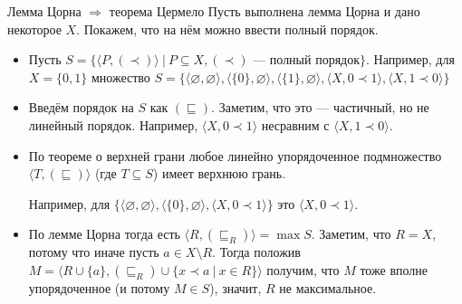 \documentclass[aspectratio=169]{beamer}
\begin{document}
\begin{frame}{Лемма Цорна $\Rightarrow$ теорема Цермело}
Пусть выполнена лемма Цорна и дано некоторое $X$. Покажем, что на нём можно ввести полный порядок.
\begin{itemize}
\item Пусть $S = \{ \langle P, (\prec)\rangle \ |\ P \subseteq X, (\prec)\text{ --- полный порядок} \}$.
{\color{gray}Например, для $X = \{0,1\}$ множество
$S = \{
\langle\varnothing,\varnothing\rangle,
\langle \{0\},\varnothing\rangle,
\langle\{1\},\varnothing\rangle,
\langle X, 0 \prec 1\rangle,
\langle X, 1 \prec 0\rangle
\}$}

\item Введём порядок на $S$ как $(\sqsubseteq)$. Заметим, что это --- частичный, но не линейный порядок. 
{\color{gray}Например, $\langle X, 0 \prec 1\rangle$ несравним с $\langle X, 1 \prec 0\rangle$.}

\item По теореме о верхней грани любое линейно упорядоченное подмножество 
$\langle T, (\sqsubseteq) \rangle$ (где $T \subseteq S$) имеет
верхнюю грань.

{\color{gray}Например, 
для $\{\langle\varnothing,\varnothing\rangle,
\langle \{0\},\varnothing\rangle,
\langle X, 0 \prec 1\rangle\}$ это $\langle X, 0 \prec 1\rangle$.}

\item По лемме Цорна тогда есть $\langle R, (\sqsubseteq_R)\rangle = \max S$. Заметим, что $R = X$, потому что иначе пусть
$a \in X\setminus R$. Тогда положив $M = \langle R\cup\{a\}, (\sqsubseteq_R)\cup\{x\prec a\ |\ x \in R\} \rangle$
получим, что $M$ тоже вполне упорядоченное (и потому $M \in S$), значит, $R$ не максимальное.
\end{itemize}
\end{frame}
\end{document}
